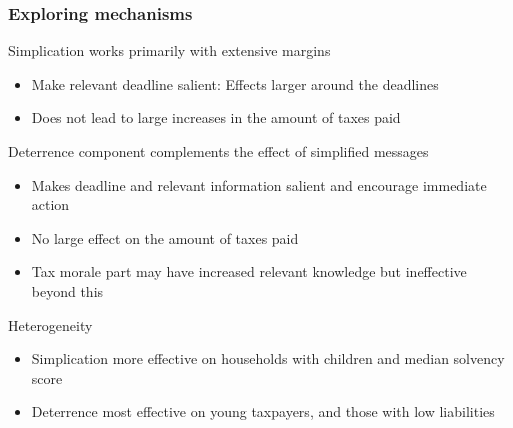 \documentclass[aspectratio=169]{beamer}
\begin{document}
\begin{frame}
\frametitle{Exploring mechanisms} 
Simplication works primarily with extensive margins
\begin{itemize}\setlength\itemsep{3pt}
  \item Make relevant deadline salient: Effects larger around the deadlines
  \item Does not lead to large increases in the amount of taxes paid
\end{itemize}\medskip
Deterrence component complements the effect of simplified messages
\begin{itemize}\setlength\itemsep{3pt}
  \item Makes deadline and relevant information salient and encourage immediate action
  \item No large effect on the amount of taxes paid
  \item Tax morale part may have increased relevant knowledge but ineffective beyond this
\end{itemize}\medskip
Heterogeneity
\begin{itemize}\setlength\itemsep{3pt}
  \item Simplication more effective on households with children and median solvency score
  \item Deterrence most effective on young taxpayers, and those with low liabilities
\end{itemize}
\end{frame}
\end{document}
